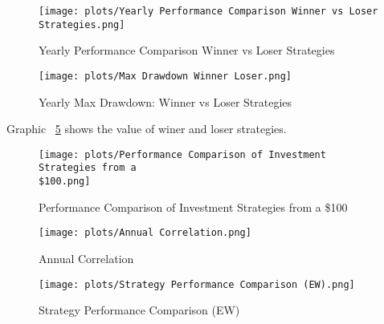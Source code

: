 \documentclass{article}
\begin{document}
\begin{figure}[htbp]
  \centering
  \texttt{[image: plots/Yearly Performance Comparison Winner vs Loser Strategies.png]}
  \caption{Yearly Performance Comparison Winner vs Loser Strategies}
  \label{fig:winer_loser_fridays}
\end{figure}
\begin{figure}[htbp]
  \centering
  \texttt{[image: plots/Max Drawdown Winner Loser.png]}
  \caption{Yearly Max Drawdown: Winner vs Loser Strategies}
  \label{fig:winer_loser_fridays}
\end{figure}
Graphic ~\ref{fig:winer_loser_fridays} shows the value of winer and loser strategies.
\begin{figure}[htbp]
  \centering
  \texttt{[image: plots/Performance Comparison of Investment Strategies from a \\\$100.png]}
  \caption{Performance Comparison of Investment Strategies from a \$100}
  \label{fig:winer_loser_fridays}
\end{figure}
\begin{figure}[htbp]
  \centering
  \texttt{[image: plots/Annual Correlation.png]}
  \caption{Annual Correlation}
  \label{fig:winer_loser_fridays}
\end{figure}


\begin{figure}[htbp]
  \centering
  \texttt{[image: plots/Strategy Performance Comparison (EW).png]}
  \caption{Strategy Performance Comparison (EW)}
  \label{fig:winer_loser_fridays}
\end{figure}



\end{document}
